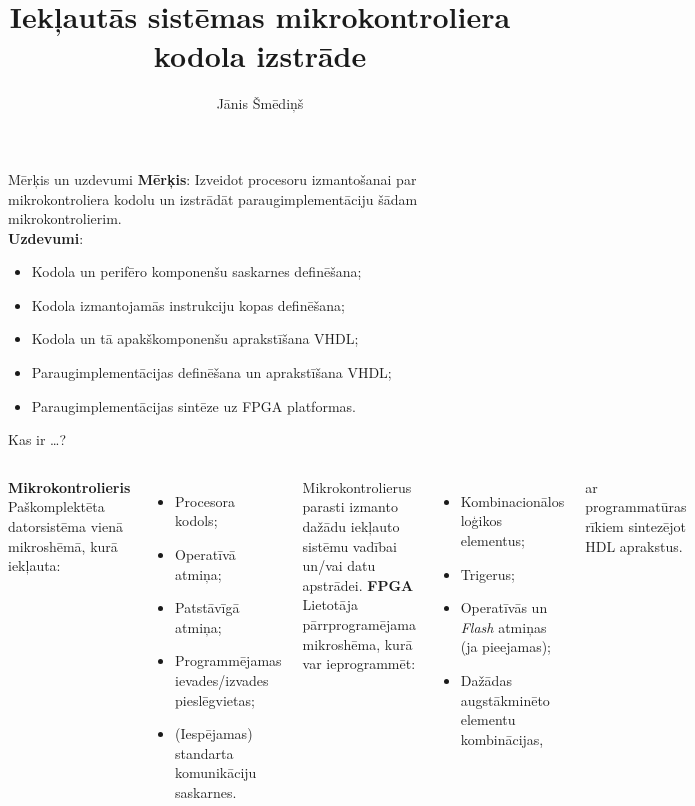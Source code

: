 \documentclass[xetex]{beamer} %
\author{Jānis Šmēdiņš}
\title[Mikrokontroliera kodola izstrāde]
	{Iekļautās sistēmas mikrokontroliera kodola izstrāde}
\begin{document}
	\begin{frame}
		\titlepage 	%
	\end{frame}
	
	\begin{frame}{Mērķis un uzdevumi}
		\textbf{Mērķis}: Izveidot procesoru izmantošanai par
			mikrokontroliera kodolu un izstrādāt paraugimplementāciju
			šādam mikrokontrolierim.\\[1em]
		\textbf{Uzdevumi}:
		\begin{itemize}\small
			\item Kodola un perifēro komponenšu saskarnes definēšana;
			\item Kodola izmantojamās instrukciju kopas definēšana;
			\item Kodola un tā apakškomponenšu aprakstīšana VHDL;
			\item Paraugimplementācijas definēšana un aprakstīšana VHDL;
			\item Paraugimplementācijas sintēze uz FPGA platformas.
		\end{itemize}
	\end{frame}
	
	\begin{frame}{Kas ir \ldots ?}
		\begin{columns}
		\column{0.49\textwidth}
			\textbf{Mikrokontrolieris}\\
			\small
			Paškomplektēta datorsistēma vienā mikroshēmā, kurā iekļauta:
			\begin{itemize}
				\item Procesora kodols;
				\item Operatīvā atmiņa;
				\item Patstāvīgā atmiņa;
				\item Programmējamas ievades/izvades pieslēgvietas;
				\item (Iespējamas) standarta komunikāciju saskarnes.
			\end{itemize}
			Mikrokontrolierus parasti izmanto dažādu iekļauto sistēmu
			vadībai un/vai datu apstrādei.
		\column{0.49\textwidth}
			\textbf{FPGA}\\
			\small
			Lietotāja pārrprogramējama mikroshēma, kurā var ieprogrammēt:
			\begin{itemize}
				\item Kombinacionālos loģikos elementus;
				\item Trigerus;
				\item Operatīvās un \textit{Flash} atmiņas
					(ja pieejamas);
				\item Dažādas augstākminēto elementu kombinācijas,
			\end{itemize}
			ar programmatūras rīkiem sintezējot HDL aprakstus.
		\end{columns}
	\end{frame}
	
\end{document}
